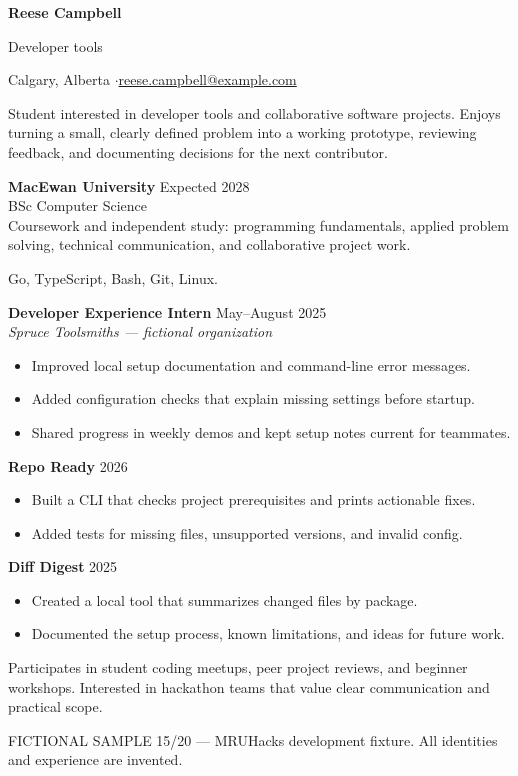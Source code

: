 
{\Huge\bfseries Reese Campbell}\par
{\large\color{accent} Developer tools}\par
Calgary, Alberta \enspace$\cdot$\enspace \href{mailto:reese.campbell@example.com}{reese.campbell@example.com}

Student interested in developer tools and collaborative software projects.
Enjoys turning a small, clearly defined problem into a working prototype,
reviewing feedback, and documenting decisions for the next contributor.

\textbf{MacEwan University} \hfill Expected 2028\\
BSc Computer Science\\
Coursework and independent study: programming fundamentals, applied problem solving,
technical communication, and collaborative project work.

Go, TypeScript, Bash, Git, Linux.

\textbf{Developer Experience Intern} \hfill May--August 2025\\
\textit{Spruce Toolsmiths --- fictional organization}
\begin{itemize}
\item Improved local setup documentation and command-line error messages.
\item Added configuration checks that explain missing settings before startup.
\item Shared progress in weekly demos and kept setup notes current for teammates.
\end{itemize}

\textbf{Repo Ready} \hfill 2026
\begin{itemize}
\item Built a CLI that checks project prerequisites and prints actionable fixes.
\item Added tests for missing files, unsupported versions, and invalid config.
\end{itemize}
\textbf{Diff Digest} \hfill 2025
\begin{itemize}
\item Created a local tool that summarizes changed files by package.
\item Documented the setup process, known limitations, and ideas for future work.
\end{itemize}

Participates in student coding meetups, peer project reviews, and beginner workshops.
Interested in hackathon teams that value clear communication and practical scope.

\vfill
{\footnotesize\color{gray} FICTIONAL SAMPLE 15/20 --- MRUHacks development fixture.
All identities and experience are invented.}


